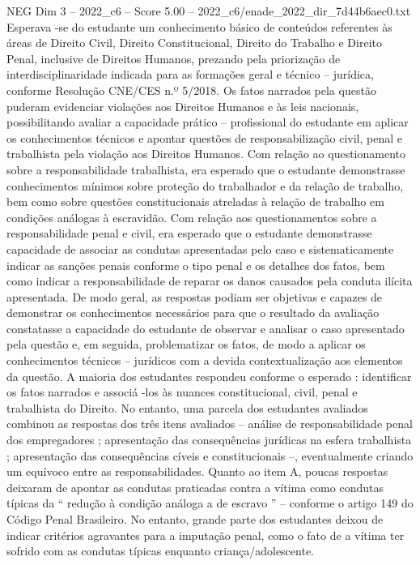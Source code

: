 \begin{textsample}{NEG Dim 3 – 2022\_c6 – Score 5.00 – 2022\_c6/enade\_2022\_dir\_7d44b6aec0.txt}
Esperava -se do estudante um conhecimento básico de conteúdos referentes às áreas de Direito Civil, Direito Constitucional, Direito do Trabalho e Direito Penal, inclusive de Direitos Humanos, prezando pela priorização de interdisciplinaridade indicada para as formações geral e técnico – jurídica, conforme Resolução CNE/CES n.º 5/2018.
Os fatos narrados pela questão puderam evidenciar violações aos Direitos Humanos e às leis nacionais, possibilitando avaliar a capacidade prático – profissional do estudante em aplicar os conhecimentos técnicos e apontar questões de responsabilização civil, penal e trabalhista pela violação aos Direitos Humanos.
Com relação ao questionamento sobre a responsabilidade trabalhista, era esperado que o estudante demonstrasse conhecimentos mínimos sobre proteção do trabalhador e da relação de trabalho, bem como sobre questões constitucionais atreladas à relação de trabalho em condições análogas à escravidão.
Com relação aos questionamentos sobre a responsabilidade penal e civil, era esperado que o estudante demonstrasse capacidade de associar as condutas apresentadas pelo caso e sistematicamente indicar as sanções penais conforme o tipo penal e os detalhes dos fatos, bem como indicar a responsabilidade de reparar os danos causados pela conduta ilícita apresentada.
De modo geral, as respostas podiam ser objetivas e capazes de demonstrar os conhecimentos necessários para que o resultado da avaliação constatasse a capacidade do estudante de observar e analisar o caso apresentado pela questão e, em seguida, problematizar os fatos, de modo a aplicar os conhecimentos técnicos – jurídicos com a devida contextualização aos elementos da questão.
A maioria dos estudantes respondeu conforme o esperado : identificar os fatos narrados e associá -los às nuances constitucional, civil, penal e trabalhista do Direito.
No entanto, uma parcela dos estudantes avaliados combinou as respostas dos três itens avaliados – análise de responsabilidade penal dos empregadores ; apresentação das consequências jurídicas na esfera trabalhista ; apresentação das consequências cíveis e constitucionais –, eventualmente criando um equívoco entre as responsabilidades.
Quanto ao item A, poucas respostas deixaram de apontar as condutas praticadas contra a vítima como condutas típicas da “ redução à condição análoga a de escravo ” – conforme o artigo 149 do Código Penal Brasileiro.
No entanto, grande parte dos estudantes deixou de indicar critérios agravantes para a imputação penal, como o fato de a vítima ter sofrido com as condutas típicas enquanto criança/adolescente.

\end{textsample}
